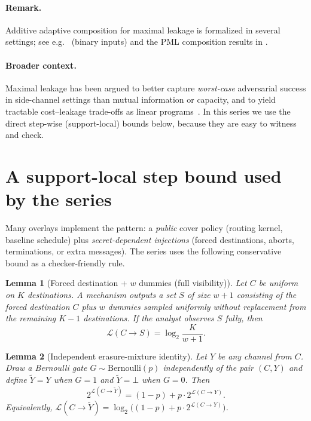 \documentclass[11pt]{article}
\newcommand{\MaxL}{\mathcal{L}}
\newcommand{\logtwo}{\log_2}
\newtheorem{lemma}{Lemma}
\begin{document}
\paragraph{Remark.} Additive adaptive composition for maximal leakage is formalized in several settings; see e.g.\ \cite{issa2022adaptive} (binary inputs) and the PML composition results in \cite{saeidian2023pml}.



\paragraph{Broader context.}
Maximal leakage has been argued to better capture \emph{worst-case} adversarial success in side-channel settings than mutual information or capacity, and to yield tractable cost--leakage trade-offs as linear programs~\cite{wu2020sidechannel}.
In this series we use the direct step-wise (support-local) bounds below, because they are easy to witness and check.

\section{A support-local step bound used by the series}\label{sec:supportlocal}
Many overlays implement the pattern:
a \emph{public} cover policy (routing kernel, baseline schedule) plus \emph{secret-dependent injections} (forced destinations, aborts, terminations, or extra messages).
The series uses the following conservative bound as a checker-friendly rule.

\begin{lemma}[Forced destination + $w$ dummies (full visibility)]\label{lem:forced_dest_full}
Let $C$ be uniform on $K$ destinations.
A mechanism outputs a set $S$ of size $w{+}1$ consisting of the forced destination $C$ plus $w$ dummies sampled uniformly without replacement from the remaining $K{-}1$ destinations.
If the analyst observes $S$ fully, then
\[
\MaxL(C\!\to\!S)=\logtwo\frac{K}{w+1}.
\]
\end{lemma}

\begin{lemma}[Independent erasure-mixture identity]\label{lem:erasure}
Let $Y$ be any channel from $C$. Draw a Bernoulli gate $G\sim\mathrm{Bernoulli}(p)$ independently of the pair $(C,Y)$ and define $\tilde Y=Y$ when $G=1$ and $\tilde Y=\bot$ when $G=0$.
Then
\[
2^{\MaxL(C\to \tilde Y)} = (1-p) + p\cdot 2^{\MaxL(C\to Y)}.
\]
Equivalently, $\MaxL(C\to \tilde Y)=\logtwo\!\big((1-p)+p\cdot 2^{\MaxL(C\to Y)}\big)$.
\end{lemma}
\end{document}
